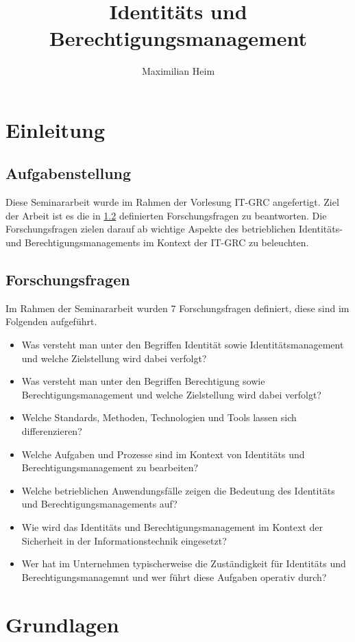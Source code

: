 \documentclass[12pt]{article}
\author{Maximilian Heim}
\title{Identitäts und Berechtigungsmanagement}
\begin{document}
\maketitle
\newpage
\tableofcontents
\newpage
\section{Einleitung}
\subsection{Aufgabenstellung}
Diese Seminararbeit wurde im Rahmen der Vorlesung IT-GRC angefertigt. Ziel der Arbeit ist es die in \cref{subsec:forschungsfragen} definierten Forschungsfragen zu beantworten. Die Forschungsfragen zielen darauf ab wichtige Aspekte des betrieblichen Identitäts- und Berechtigungsmanagements im Kontext der IT-GRC zu beleuchten.
\subsection{Forschungsfragen}
\label{subsec:forschungsfragen}
Im Rahmen der Seminararbeit wurden 7 Forschungsfragen definiert, diese sind im Folgenden aufgeführt.
\begin{itemize}
  \item Was versteht man unter den Begriffen \glqq{}Identität\grqq{} sowie \glqq{}Identitätsmanagement\grqq{} und welche Zielstellung wird dabei verfolgt?
  \item Was versteht man unter den Begriffen \glqq{}Berechtigung\grqq{} sowie \glqq{}Berechtigungsmanagement\grqq{} und welche Zielstellung wird dabei verfolgt?
  \item Welche Standards, Methoden, Technologien und Tools lassen sich differenzieren?
  \item Welche Aufgaben und Prozesse sind im Kontext von Identitäts und Berechtigungsmanagement zu bearbeiten?
  \item Welche betrieblichen Anwendungsfälle zeigen die Bedeutung des Identitäts und Berechtigungsmanagements auf?
  \item Wie wird das Identitäts und Berechtigungsmanagement im Kontext der Sicherheit in der Informationstechnik eingesetzt?
  \item Wer hat im Unternehmen typischerweise die Zuständigkeit für Identitäts und Berechtigungsmanagemnt und wer führt diese Aufgaben operativ durch?
\end{itemize}
\section{Grundlagen}
\label{sec:grundlagen}
\end{document}
